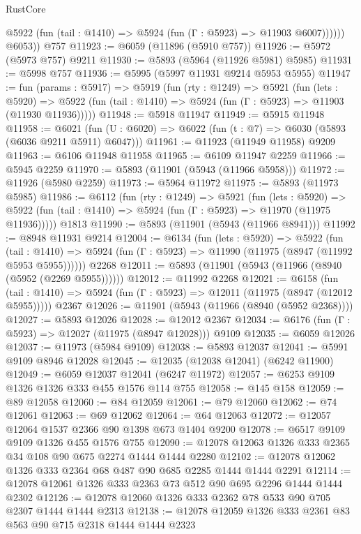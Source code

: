 \begin{lexlean}{RustCore}
\begin{coremodule}
              @5922 (fun (tail : @1410) => @5924 (fun (Γ : @5923) => @11903 @6007))))))
        @6053))
    @757
@11923 := @6059 (@11896 (@5910 @757))
@11926 := @5972 (@5973 @757) @9211
@11930 := @5893 (@5964 (@11926 @5981) @5985)
@11931 := @5998 @757
@11936 := @5995 (@5997 @11931 @9214 @5953 @5955)
@11947 := fun (params : @5917) =>
  @5919
    (fun (rty : @1249) =>
    @5921
      (fun (lets : @5920) =>
      @5922 (fun (tail : @1410) => @5924 (fun (Γ : @5923) => @11903 (@11930 @11936)))))
@11948 := @5918 @11947
@11949 := @5915 @11948
@11958 := @6021 (fun (U : @6020) => @6022 (fun (t : @7) => @6030 (@5893 (@6036 @9211 @5911) @6047)))
@11961 := @11923 (@11949 @11958) @9209
@11963 := @6106 @11948 @11958
@11965 := @6109 @11947 @2259
@11966 := @5945 @2259
@11970 := @5893 (@11901 (@5943 (@11966 @5958)))
@11972 := @11926 (@5980 @2259)
@11973 := @5964 @11972
@11975 := @5893 (@11973 @5985)
@11986 := @6112
    (fun (rty : @1249) =>
    @5921
      (fun (lets : @5920) =>
      @5922 (fun (tail : @1410) => @5924 (fun (Γ : @5923) => @11970 (@11975 @11936)))))
    @1813
@11990 := @5893 (@11901 (@5943 (@11966 @8941)))
@11992 := @8948 @11931 @9214
@12004 := @6134
    (fun (lets : @5920) =>
    @5922
      (fun (tail : @1410) =>
      @5924 (fun (Γ : @5923) => @11990 (@11975 (@8947 (@11992 @5953 @5955))))))
    @2268
@12011 := @5893 (@11901 (@5943 (@11966 (@8940 (@5952 (@2269 @5955))))))
@12012 := @11992 @2268
@12021 := @6158
    (fun (tail : @1410) => @5924 (fun (Γ : @5923) => @12011 (@11975 (@8947 (@12012 @5955)))))
    @2367
@12026 := @11901 (@5943 (@11966 (@8940 (@5952 @2368))))
@12027 := @5893 @12026
@12028 := @12012 @2367
@12034 := @6176 (fun (Γ : @5923) => @12027 (@11975 (@8947 @12028))) @9109
@12035 := @6059 @12026
@12037 := @11973 (@5984 @9109)
@12038 := @5893 @12037
@12041 := @5991 @9109 @8946 @12028
@12045 := @12035 (@12038 @12041) (@6242 @11900)
@12049 := @6059 @12037 @12041 (@6247 @11972)
@12057 := @6253 @9109 @1326 @1326 @333 @455 @1576 @114 @755
@12058 := @145 @158
@12059 := @89 @12058
@12060 := @84 @12059
@12061 := @79 @12060
@12062 := @74 @12061
@12063 := @69 @12062
@12064 := @64 @12063
@12072 := @12057 @12064 @1537 @2366 @90 @1398 @673 @1404 @9200
@12078 := @6517 @9109 @9109 @1326 @455 @1576 @755
@12090 := @12078 @12063 @1326 @333 @2365 @34 @108 @90 @675 @2274 @1444 @1444 @2280
@12102 := @12078 @12062 @1326 @333 @2364 @68 @487 @90 @685 @2285 @1444 @1444 @2291
@12114 := @12078 @12061 @1326 @333 @2363 @73 @512 @90 @695 @2296 @1444 @1444 @2302
@12126 := @12078 @12060 @1326 @333 @2362 @78 @533 @90 @705 @2307 @1444 @1444 @2313
@12138 := @12078 @12059 @1326 @333 @2361 @83 @563 @90 @715 @2318 @1444 @1444 @2323

\end{coremodule}
\end{lexlean}
